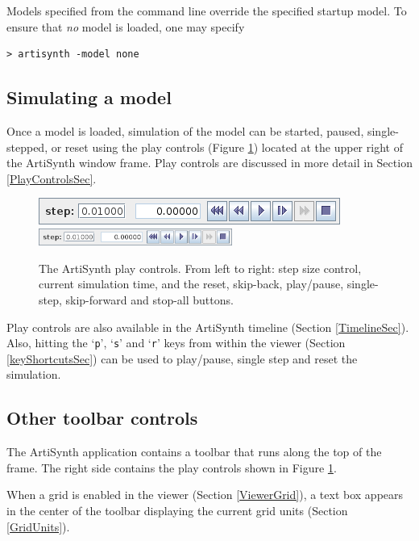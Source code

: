 \documentclass{article}
\begin{document}
Models specified from the command line override the specified startup
model. To ensure that {\it no} model is loaded, one may specify
%
\begin{verbatim}
> artisynth -model none
\end{verbatim}
%

\subsection{Simulating a model}
\label{SimulatingSec}

Once a model is loaded, simulation of the model can be started,
paused, single-stepped, or reset using the play controls (Figure
\ref{PlayControlsFig}) located at the upper right of the ArtiSynth
window frame. Play controls are discussed in more detail in Section
\ref{PlayControlsSec}.

\begin{figure}[h]
\begin{center}
\iflatexml
\includegraphics[]{images/playControls}
\else
\includegraphics[width=2.5in]{images/playControls}
\fi
\end{center}
\caption{The ArtiSynth play controls. From left to right: step size
control, current simulation time, and the reset, skip-back,
play/pause, single-step, skip-forward and stop-all buttons.}%
\label{PlayControlsFig}
\end{figure}

Play controls are also available in the ArtiSynth timeline (Section
\ref{TimelineSec}).  Also, hitting the `{\tt p}', `{\tt s}'
and `{\tt r}' keys from within the viewer (Section
\ref{keyShortcutsSec}) can be used to play/pause, single step and
reset the simulation.


\subsection{Other toolbar controls}

The ArtiSynth application contains a toolbar that runs along the top
of the frame. The right side contains the play controls shown in
Figure \ref{PlayControlsFig}.

When a grid is enabled in the viewer (Section \ref{ViewerGrid}), a
text box appears in the center of the toolbar displaying the current
grid units (Section \ref{GridUnits}).
\end{document}
